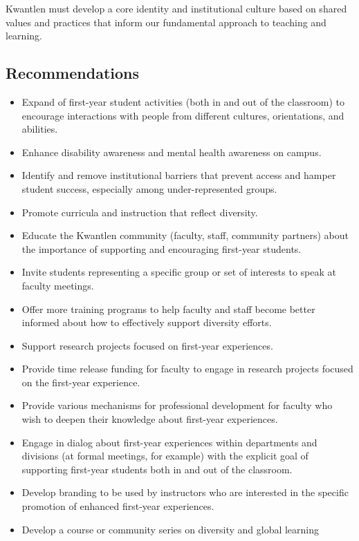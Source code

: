 \documentclass[10pt, letterpaper]{article}
\begin{document}
Kwantlen must develop a core identity and institutional culture based on
shared values and practices that inform our fundamental approach to
teaching and learning.

\subsection{Recommendations}

\begin{itemize}
\item
  Expand of first-year student activities (both in and out of the
  classroom) to encourage interactions with people from different
  cultures, orientations, and abilities.
\item
  Enhance disability awareness and mental health awareness on campus.
\item
  Identify and remove institutional barriers that prevent access and
  hamper student success, especially among under-represented groups.
\item
  Promote curricula and instruction that reflect diversity.
\item
  Educate the Kwantlen community (faculty, staff, community partners)
  about the importance of supporting and encouraging first-year
  students.
\item
  Invite students representing a specific group or set of interests to
  speak at faculty meetings.
\item
  Offer more training programs to help faculty and staff become better
  informed about how to effectively support diversity efforts.
\item
  Support research projects focused on first-year experiences.
\item
  Provide time release funding for faculty to engage in research
  projects focused on the first-year experience.
\item
  Provide various mechanisms for professional development for faculty
  who wish to deepen their knowledge about first-year experiences.
\item
  Engage in dialog about first-year experiences within departments and
  divisions (at formal meetings, for example) with the explicit goal of
  supporting first-year students both in and out of the classroom.
\item
  Develop branding to be used by instructors who are interested in the
  specific promotion of enhanced first-year experiences.
\item
  Develop a course or community series on diversity and global learning

\end{itemize}
\end{document}
